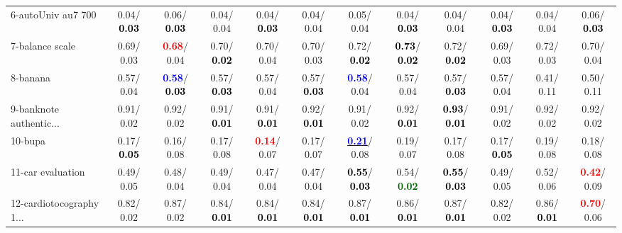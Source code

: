 \begin{table}[h]
\begin{center}
{\begin{tabular}{lc|c|c|c|c|c|c|c|c|c|c}
6-autoUniv au7 700 &   0.04/\textcolor{black}{\textbf{  0.03}} &   0.06/\textcolor{black}{\textbf{  0.03}} &   0.04/  0.04 &   0.04/\textcolor{black}{\textbf{  0.03}} &   0.04/  0.04 &   0.05/  0.04 &   0.04/\textcolor{black}{\textbf{  0.03}} &   0.04/  0.04 &   0.04/\textcolor{black}{\textbf{  0.03}} &   0.04/  0.04 &   0.06/\textcolor{black}{\textbf{  0.03}} \\
7-balance scale &   0.69/  0.03 & \textcolor{red}{\textbf{  0.68}}/  0.04 &   0.70/\textcolor{black}{\textbf{  0.02}} &   0.70/  0.04 &   0.70/  0.03 &   0.72/\textcolor{black}{\textbf{  0.02}} & \textcolor{black}{\textbf{  0.73}}/\textcolor{black}{\textbf{  0.02}} &   0.72/\textcolor{black}{\textbf{  0.02}} &   0.69/  0.03 &   0.72/  0.03 &   0.70/  0.04 \\ \hline
8-banana &   0.57/  0.04 & \textcolor{blue}{\textbf{  0.58}}/\textcolor{black}{\textbf{  0.03}} &   0.57/\textcolor{black}{\textbf{  0.03}} &   0.57/  0.04 &   0.57/\textcolor{black}{\textbf{  0.03}} & \textcolor{blue}{\textbf{  0.58}}/  0.04 &   0.57/  0.04 &   0.57/\textcolor{black}{\textbf{  0.03}} &   0.57/  0.04 &   0.41/  0.11 &   0.50/  0.11 \\
9-banknote authentic... &   0.91/  0.02 &   0.92/  0.02 &   0.91/\textcolor{black}{\textbf{  0.01}} &   0.91/\textcolor{black}{\textbf{  0.01}} &   0.92/\textcolor{black}{\textbf{  0.01}} &   0.91/  0.02 &   0.92/\textcolor{black}{\textbf{  0.01}} & \textcolor{black}{\textbf{  0.93}}/\textcolor{black}{\textbf{  0.01}} &   0.91/  0.02 &   0.92/  0.02 &   0.92/  0.02 \\
10-bupa &   0.17/\textcolor{black}{\textbf{  0.05}} &   0.16/  0.08 &   0.17/  0.08 & \textcolor{red}{\textbf{  0.14}}/  0.07 &   0.17/  0.07 & \underline{\textcolor{blue}{\textbf{  0.21}}}/  0.08 &   0.19/  0.07 &   0.17/  0.08 &   0.17/\textcolor{black}{\textbf{  0.05}} &   0.19/  0.08 &   0.18/  0.08 \\
11-car evaluation &   0.49/  0.05 &   0.48/  0.04 &   0.49/  0.04 &   0.47/  0.04 &   0.47/  0.04 & \textcolor{black}{\textbf{  0.55}}/\textcolor{black}{\textbf{  0.03}} &   0.54/\textcolor{darkgreen}{\textbf{  0.02}} & \textcolor{black}{\textbf{  0.55}}/\textcolor{black}{\textbf{  0.03}} &   0.49/  0.05 &   0.52/  0.06 & \textcolor{red}{\textbf{  0.42}}/  0.09 \\
12-cardiotocography 1... &   0.82/  0.02 &   0.87/  0.02 &   0.84/\textcolor{black}{\textbf{  0.01}} &   0.84/\textcolor{black}{\textbf{  0.01}} &   0.84/\textcolor{black}{\textbf{  0.01}} &   0.87/\textcolor{black}{\textbf{  0.01}} &   0.86/\textcolor{black}{\textbf{  0.01}} &   0.87/\textcolor{black}{\textbf{  0.01}} &   0.82/  0.02 &   0.86/\textcolor{black}{\textbf{  0.01}} & \textcolor{red}{\textbf{  0.70}}/  0.06 \\

\end{tabular}}
\end{center}
\end{table}
